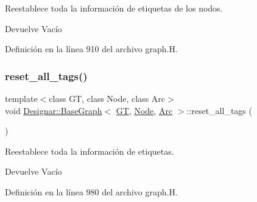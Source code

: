 Reestablece toda la información de etiquetas de los nodos. 

\begin{DoxyReturn}{Devuelve}
Vacío 
\end{DoxyReturn}


Definición en la línea 910 del archivo graph.\+H.

\mbox{\label{class_designar_1_1_base_graph_ae62e72668468a2aaa3ddc91246e1ee1c}} 
\subsubsection{\texorpdfstring{reset\+\_\+all\+\_\+tags()}{reset\_all\_tags()}}
{\footnotesize\ttfamily template$<$class GT, class Node, class Arc$>$ \\
void \hyperlink{class_designar_1_1_base_graph}{Designar\+::\+Base\+Graph}$<$ \hyperlink{demo-buildgraph_8_c_a3001c40d2c31ca87ed96cd7d1334a55e}{GT}, \hyperlink{namespace_designar_a5af326c65aa2bd26b26c410f2030d09e}{Node}, \hyperlink{namespace_designar_a3f55fb5513d62ff47cbc8f72b8e95d6f}{Arc} $>$\+::reset\+\_\+all\+\_\+tags (\begin{DoxyParamCaption}{ }\end{DoxyParamCaption})\hspace{0.3cm}{\ttfamily [inline]}}



Reestablece toda la información de etiquetas. 

\begin{DoxyReturn}{Devuelve}
Vacío 
\end{DoxyReturn}


Definición en la línea 980 del archivo graph.\+H.

\mbox{\label{class_designar_1_1_base_graph_a44b6cefb8966ed69a0d80bfe7e4546cb}} 
